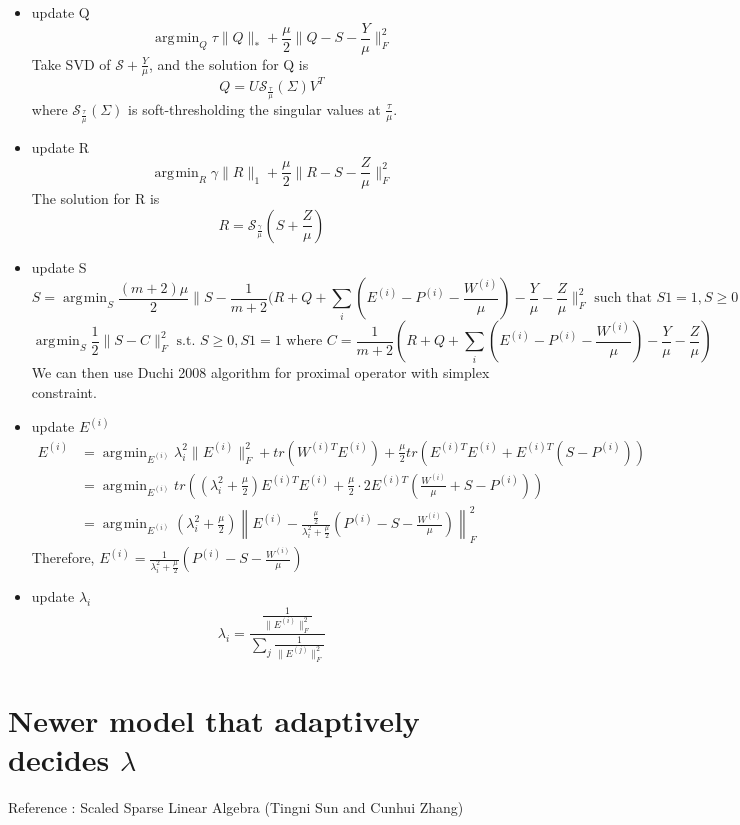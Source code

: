 \documentclass[11pt]{article}
\newcommand{\norm}[1]{\left\lVert#1\right\rVert}
\DeclareMathOperator*{\argmin}{\arg\!\min}
\begin{document}
\begin{itemize}
\item update Q
$$\argmin_Q \tau \|Q\|_* + \frac{\mu}{2} \|Q-S-\frac{Y}{\mu}\|_F^2$$
Take SVD of $\mathcal{S}+\frac{Y}{\mu}$, and the solution for Q is
$$Q = U \mathcal{S}_{\frac{\tau}{\mu}}(\Sigma) V^T$$
where $\mathcal{S}_{\frac{\tau}{\mu}}(\Sigma)$ is soft-thresholding the singular values at $\frac{\tau}{\mu}$.
\item update R
$$\argmin_R \gamma \|R\|_1 + \frac{\mu}{2} \|R-S-\frac{Z}{\mu}\|_F^2$$
The solution for R is
$$R = \mathcal{S}_{\frac{\gamma}{\mu}}(S+\frac{Z}{\mu}) $$
\item update S
$$S = \argmin_S \frac{(m+2)\mu}{2} \|
S-\frac{1}{m+2} (R+Q+\sum_i (E^{(i)}-P^{(i)}-\frac{W^{(i)}}{\mu}) - \frac{Y}{\mu} - \frac{Z}{\mu}
\|_F^2 \text{ such that } S1 = 1, S\geq 0$$
$$\argmin_S \frac{1}{2} \|S-C\|_F^2 \text{ s.t. } S\geq 0, S1=1 \text{  where  } C = \frac{1}{m+2} \left(R+Q+\sum_i(E^{(i)}-P^{(i)}-\frac{W^{(i)}}{\mu}) - \frac{Y}{\mu} - \frac{Z}{\mu}\right)$$
We can then use Duchi 2008 algorithm for proximal operator with simplex constraint.

\item update $E^{(i)}$
\begin{align*}
E^{(i)} &= \argmin_{E^{(i)}} \lambda_i^2 \|E^{(i)}\|_F^2 + tr(W^{(i)T} E^{(i)}) + \frac{\mu}{2} tr(E^{(i)T} E^{(i)} + E^{(i)T} (S-P^{(i)}))\\
&= \argmin_{E^{(i)}} tr \left(
(\lambda_i^2 + \frac{\mu}{2}) E^{(i)T} E^{(i)} + \frac{\mu}{2} \cdot 2 E^{(i)T} \left(
\frac{W^{(i)}}{\mu} + S - P^{(i)}
\right)
\right)\\
&= \argmin_{E^{(i)}} \left(\lambda_i^2 + \frac{\mu}{2}\right)
\norm{
E^{(i)} - \frac{\frac{\mu}{2}}{\lambda_i^2 + \frac{\mu}{2}}\left(P^{(i)}-S-\frac{W^{(i)}}{\mu}\right)
}_F^2
\end{align*}
Therefore, $E^{(i)} = \frac{1}{\lambda_i^2 + \frac{\mu}{2}}\left(P^{(i)}-S-\frac{W^{(i)}}{\mu}\right)$

\item update $\lambda_i$
$$\lambda_i = \frac{\frac{1}{\|E^{(i)}\|_F^2}}{\sum_j \frac{1}{\|E^{(j)}\|_F^2}}$$
\end{itemize}


\section*{Newer model that adaptively decides $\lambda$}

Reference : Scaled Sparse Linear Algebra (Tingni Sun and Cunhui Zhang)\\
\end{document}
